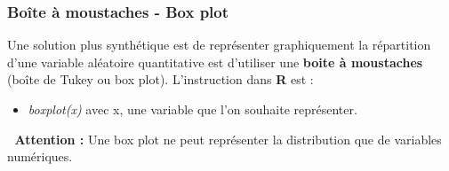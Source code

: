 \subsubsection{Boîte à moustaches - Box plot}
Une solution plus synthétique est de représenter graphiquement la répartition d'une variable aléatoire quantitative est d'utiliser une \textbf{boite à moustaches} (boîte de Tukey ou box plot).\newline
L'instruction dans \textbf{R} est : 
\begin{itemize}
\item \textit{boxplot(x)} avec x, une variable que l'on souhaite représenter.
\end{itemize}
\textcolor{white}{.}\newline
\textbf{Attention : } Une box plot ne peut représenter la distribution que de variables numériques.

